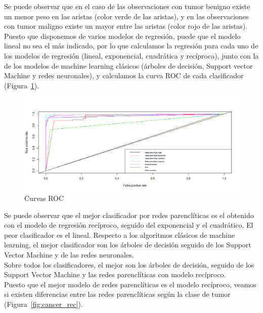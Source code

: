 Se puede observar que en el caso de las observaciones con tumor benigno existe un menor peso en las aristas (color verde de las aristas), y en las observaciones con tumor maligno existe un mayor entre las aristas (color rojo de las aristas).\\

Puesto que disponemos de varios modelos de regresión, puede que el modelo lineal no sea el más indicado, por lo que calculamos la regresión para cada uno de los modelos de regresión (lineal, exponencial, cuadrática y recíproca), junto con la de los modelos de machine learning clásicos (árboles de decisión, Support vector Machine y redes neuronales), y calculamos la curva ROC de cada clasificador (Figura~\ref{fig:roc_cancer}).\\

\begin{figure}[tbph!]
	\centering
	\includegraphics[width=0.9\linewidth]{imagenes/cancer/ROC_cancer.png}
	\caption{Curvas ROC}
	\label{fig:roc_cancer}
\end{figure}

Se puede observar que el mejor clasificador por redes parenclíticas es el obtenido con el modelo de regresión recíproco, seguido del exponencial y el cuadrático. El peor clasificador es el lineal. Respecto a los algoritmos clásicos de machine learning, el mejor clasificador son los árboles de decisión seguido de los Support Vector Machine y de las redes neuronales.\\

Sobre todos los clasificadores, el mejor son los árboles de decisión, seguido de los Support Vector Machine y las redes parenclíticas con modelo recíproco.\\
 
Puesto que el mejor modelo de redes parenclíticas es el modelo recíproco, veamos si existen diferencias entre las redes parenclíticas según la clase de tumor (Figura~\ref{fig:cancer_rec}).\\


